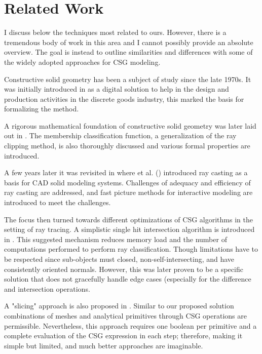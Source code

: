 \documentclass[a4paper,11pt,oneside]{article}
\begin{document}
  
\section{Related Work}
  
I discuss below the techniques most related to ours. However, there is a tremendous body of work in this area and I cannot possibly provide an absolute overview. The goal is instead to outline similarities and differences with some of the widely adopted approaches for CSG modeling.

Constructive solid geometry has been a subject of study since the late 1970s. It was initially introduced in \cite{GEOMETRIC_MODELING_1977} as a digital solution to help in the design and production activities in the discrete goods industry, this marked the basis for formalizing the method.
  
A rigorous mathematical foundation of constructive solid geometry was later laid out in \cite{Requicha1978MathematicalFO}. The membership classification function, a generalization of the ray clipping method, is also thoroughly discussed and various formal properties are introduced.
  
A few years later it was revisited in \cite{ROTH1982109} where \citeauthor{ROTH1982109} et al. (\citeyear{ROTH1982109}) introduced ray casting as a basis for CAD solid modeling systems. Challenges of adequacy and efficiency of ray casting are addressed, and fast picture methods for interactive modeling are introduced to meet the challenges.
  
The focus then turned towards different optimizations of CSG algorithms in the setting of ray tracing. A simplistic single hit intersection algorithm is introduced in \cite{kensler_ray_2006}. This suggested mechanism reduces memory load and the number of computations performed to perform ray classification. Though limitations have to be respected since sub-objects must closed, non-self-intersecting, and have consistently oriented normals. However, this was later proven to be a specific solution that does not gracefully handle edge cases (especially for the difference and intersection operations.
  
A "slicing" approach is also proposed in \cite{lefebvre:hal-00926861}. Similar to our proposed solution combinations of meshes and analytical primitives through CSG operations are permissible. Nevertheless, this approach requires one boolean per primitive and a complete evaluation of the CSG expression in each step; therefore, making it simple but limited, and much better approaches are imaginable.
\end{document}
